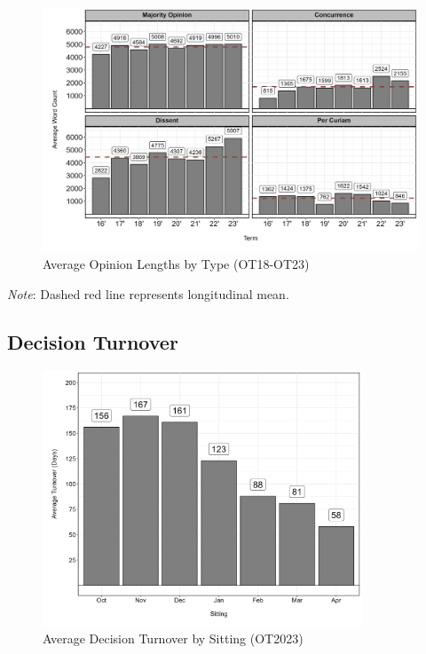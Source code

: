 \begin{landscape}
\begin{figure}[H]
\centering
\caption{Average Opinion Lengths by Type (OT18-OT23)}
\vspace{1.5mm}
\includegraphics[width = 1.25\textwidth]{"Figures/statpack_figures/opinion_lengths_longitudinal.png"}

\end{figure}

\vspace{0.5mm}

\centering
\footnotesize{\emph{Note}: Dashed red line represents longitudinal mean.}


\newpage

\subsection{\centering Decision Turnover}

\begin{figure}[H]
\centering
\caption{Average Decision Turnover by Sitting (OT2023)}
\vspace{1.5mm}
\includegraphics[width = 0.85\textwidth]{Figures/statpack_figures/decision_turnover_OT23.png}
\end{figure}


\end{landscape}
